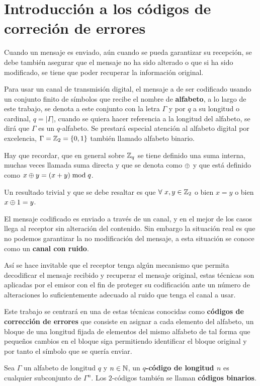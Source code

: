 \section{Introducción a los códigos de correción de errores}

Cuando un mensaje es enviado, aún cuando se pueda garantizar su recepción, se debe también asegurar que el mensaje no ha sido alterado o que si ha sido modificado, se tiene que poder recuperar la información original.

Para usar un canal de transmisión digital, el mensaje a de ser codificado usando un conjunto finito de símbolos que recibe el nombre de \textbf{alfabeto}, a lo largo de este trabajo, se denota a este conjunto con la letra $\Gamma$ y por $q$ a su longitud o cardinal, $q=|\Gamma|$, cuando se quiera hacer referencia a la longitud del alfabeto, se dirá que $\Gamma$ es un $q$-alfabeto.
Se prestará especial atención al alfabeto digital por excelencia, $\Gamma = \mathbb{Z}_2 = \left\{0, 1\right\}$ también llamado alfabeto binario.

Hay que recordar, que en general sobre $\mathbb{Z}_q$ se tiene definido una suma interna, muchas veces llamada suma directa y que se denota como $\oplus$ y que está definido como $x\oplus y = (x+y)\bmod q$.

Un resultado trivial y que se debe resaltar es que $\forall\, x,y\in\Z_2$ o bien $x=y$ o bien $x\oplus 1=y$.

El mensaje codificado es enviado a través de un canal, y en el mejor de los casos llega al receptor sin alteración del contenido.
Sin embargo la situación real es que no podemos garantizar la no modificación del mensaje, a esta situación se conoce como un \textbf{canal con ruido}.

Así se hace invitable que el receptor tenga algún mecanismo que permita decodificar el mensaje recibido y recuperar el mensaje original, estas técnicas son aplicadas por el emisor con el fin de proteger su codificación ante un número de alteraciones lo suficientemente adecuado al ruido que tenga el canal a usar.

Este trabajo se centrará en una de estas técnicas conocidas como \textbf{códigos de corrección de errores} que consiste en asignar a cada elemento del alfabeto, un bloque de una longitud fijada de elementos del mismo alfabeto de tal forma que pequeños cambios en el bloque siga permitiendo identificar el bloque original y por tanto el símbolo que se quería enviar.

\begin{definition}
	Sea $\Gamma$ un alfabeto de longitud $q$ y $n\in\mathbb{N}$, un \textbf{$q$-código de longitud $n$} es cualquier subconjunto de $\Gamma^n$.
	Los $2$-códigos también se llaman \textbf{códigos binarios}.
\end{definition}

